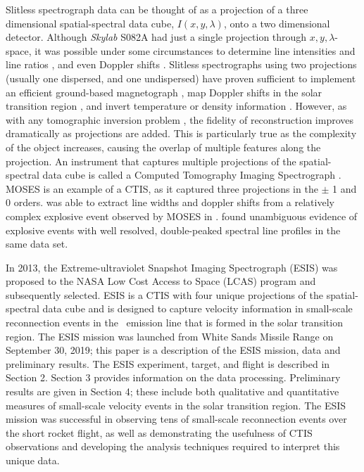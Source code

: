     Slitless spectrograph data can be thought of as a projection of a three dimensional spatial-spectral data cube, $I(x,y,\lambda)$, onto a two dimensional detector.  
    Although {\it Skylab} S082A had just a single projection through $x,y,\lambda$-space, it was possible under some circumstances to determine line intensities and line ratios \cite[e.g.,][]{Keenan1988, Tayal1989, Keenan2006}, and even Doppler shifts \citep{MariskaDoppler1992}. 
    Slitless spectrographs using two projections (usually one dispersed, and one undispersed) have proven sufficient to implement an efficient ground-based magnetograph \citep{DeforestStereoscopy2004}, map Doppler shifts in the solar transition region \citep{Courrier2018}, and invert temperature or density information \citep{winebarger2019}. 
    However, as with any tomographic inversion problem \citep[e.g.,][]{KakSlaney2001}, the fidelity of reconstruction improves dramatically as projections are added. 
    This is particularly true as the complexity of the object increases, causing the overlap of multiple features along the projection. 
    An instrument that captures multiple projections of the spatial-spectral data cube is called a Computed Tomography Imaging Spectrograph  \cite[CTIS,][]{DescourDereniakCTIS1995}.  
    MOSES is an example of a CTIS, as it captured three projections in the $\pm$ 1 and 0 orders.  
    \cite{Fox10} was able to extract line widths and doppler shifts from a relatively complex explosive event observed by MOSES in \heii.  
    \cite{Rust2019} found unambiguous evidence of explosive events with well resolved, double-peaked spectral line profiles in the same data set.
    
    In 2013, the Extreme-ultraviolet Snapshot Imaging Spectrograph (ESIS) was proposed to the NASA Low Cost Access to Space (LCAS) program and subsequently selected.  
    ESIS is a CTIS with four unique projections of the spatial-spectral data cube and is designed to capture velocity information in small-scale reconnection events in the \ov \ emission line that is formed in the solar transition region.  
    The ESIS mission was launched from White Sands Missile Range on September 30,  2019; this paper is a description of the ESIS mission, data and preliminary results.  
    The ESIS experiment, target, and flight is described in Section 2.  
    Section 3 provides information on the data processing.  Preliminary results are given in Section 4; these include both qualitative and quantitative measures of small-scale velocity events in the solar transition region.  The ESIS mission was successful in  observing tens of small-scale reconnection events over the short rocket flight, as well as demonstrating the usefulness of CTIS observations and developing the analysis techniques required to interpret this unique data.


